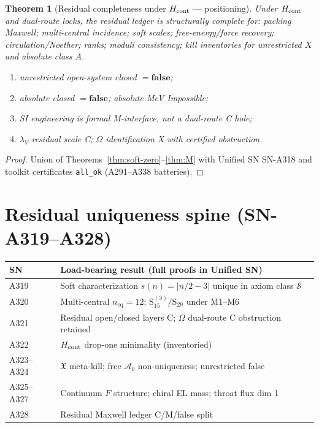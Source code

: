 \documentclass[11pt,a4paper]{article}
\newtheorem{theorem}{Theorem}
\theoremstyle{remark}
\begin{document}
\begin{theorem}[Residual completeness under $H_{\rm cont}$ --- positioning]
\label{thm:positioning}
Under $H_{\rm cont}$ and dual-route locks, the residual ledger is structurally complete for: packing Maxwell; multi-central incidence; soft scales; free-energy/force recovery; circulation/Noether; ranks; moduli consistency; kill inventories for unrestricted $X$ and absolute class $A$.
\begin{enumerate}[label=(\roman*)]
\item unrestricted open-system closed $=\mathbf{false}$;
\item absolute closed $=\mathbf{false}$; absolute MeV Impossible;
\item SI engineering is formal M-interface, not a dual-route C hole;
\item $\lambda_V$ residual scale C; $\Omega$ identification X with certified obstruction.
\end{enumerate}
\end{theorem}

\begin{proof}
Union of Theorems~\ref{thm:soft-zero}--\ref{thm:M} with Unified SN SN-A318 and toolkit certificates \texttt{all\_ok} (A291--A338 batteries).
\end{proof}



\section{Residual uniqueness spine (SN-A319--A328)}
\label{sec:spine-A319-A328}

\begin{center}
\begin{tabular}{@{}p{3.2cm}p{8.2cm}@{}}
\toprule
SN & Load-bearing result (full proofs in Unified SN) \\
\midrule
A319 & Soft characterization $s(n)=|n/2-3|$ unique in axiom class $\mathcal{S}$ \\
A320 & Multi-central $n_{\mathrm{eq}}=12$; $\mathrm{S}_{15}^{(3)}/\mathrm{S}_{29}$ under M1--M6 \\
A321 & Residual open/closed layers C; $\Omega$ dual-route C obstruction retained \\
A322 & $H_{\rm cont}$ drop-one minimality (inventoried) \\
A323--A324 & $\mathfrak{X}$ meta-kill; free $\mathcal{A}_0$ non-uniqueness; unrestricted false \\
A325--A327 & Continuum $F$ structure; chiral EL mass; throat flux dim 1 \\
A328 & Residual Maxwell ledger C/M/false split \\
\bottomrule
\end{tabular}
\end{center}
\end{document}
